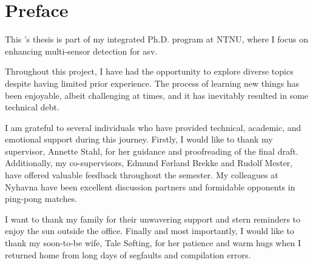\chapter*{Preface}

This \master's thesis is part of my integrated Ph.D. program at NTNU, where I focus on enhancing multi-sensor detection for \gls{asv}.

Throughout this project, I have had the opportunity to explore diverse topics despite having limited prior experience. The process of learning new things has been enjoyable, albeit challenging at times, and it has inevitably resulted in some technical debt.

I am grateful to several individuals who have provided technical, academic, and emotional support during this journey. Firstly, I would like to thank my supervisor, Annette Stahl, for her guidance and proofreading of the final draft. Additionally, my co-supervisors, Edmund Førland Brekke and Rudolf Mester, have offered valuable feedback throughout the semester. My colleagues at Nyhavna have been excellent discussion partners and formidable opponents in ping-pong matches.

I want to thank my family for their unwavering support and stern reminders to enjoy the sun outside the office.
Finally and most importantly, I would like to thank my soon-to-be wife, Tale Søfting, for her patience and warm hugs when I returned home from long days of segfaults and compilation errors.




